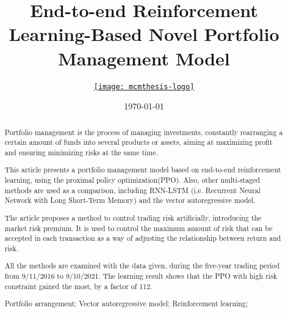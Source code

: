 \documentclass{mcmthesis}
\title{End-to-end Reinforcement Learning-Based Novel Portfolio Management Model}
\author{\small \href{MCM 2022 Team 2207690}
  {\texttt{[image: mcmthesis-logo]}}}
\date{\today}
\begin{document}
\begin{abstract}





Portfolio management is the process of managing investments,
constantly rearranging a certain amount of funds into several products or assets,
aiming at maximizing profit and ensuring minimizing risks at the same time.

This article presents a portfolio management model based on end-to-end reinforcement learning, using the proximal policy optimization(PPO).
Also, other multi-staged methods are used as a comparison, including RNN-LSTM (i.e. Recurrent Neural Network with Long Short-Term Memory) and the vector autoregressive model.

The article proposes a method to control trading risk artificially, introducing the market risk premium.
It is used to control the maximum amount of risk that can be accepted in each transaction as a way of adjusting the relationship between return and risk.

All the methods are examined with the data given, during the five-year trading period from 9/11/2016 to 9/10/2021.
The learning result shows that the PPO with high risk constraint gained the most, by a factor of 112.

\begin{keywords}
Portfolio arrangement; Vector autoregressive model; Reinforcement learning;
\end{keywords}
\end{abstract}
\maketitle

\tableofcontents
\newpage
\end{document}
